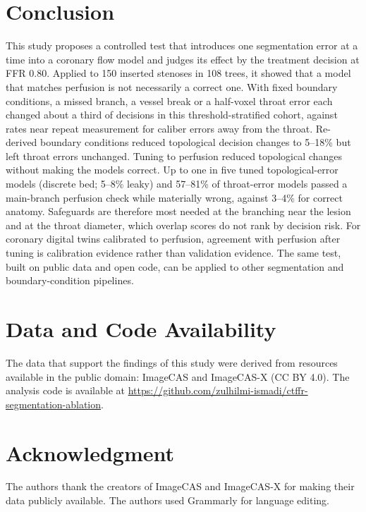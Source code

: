 \documentclass[journal,twoside,web]{ieeecolor}
\begin{document}
\section{Conclusion}
This study proposes a controlled test that introduces one segmentation error at a time into a coronary flow model and judges
its effect by the treatment decision at FFR 0.80. Applied to 150 inserted stenoses in 108 trees, it showed that a model that matches
perfusion is not necessarily a correct one. With fixed boundary conditions, a missed branch, a vessel break or a half-voxel throat error each changed about a
third of decisions in this threshold-stratified cohort, against rates near repeat measurement for caliber errors
away from the throat. Re-derived boundary conditions reduced topological decision changes to 5--18\% but left
throat errors unchanged. Tuning to perfusion reduced topological changes without making the models correct. Up to one in five tuned topological-error models (discrete bed; 5--8\% leaky) and 57--81\% of throat-error models passed a main-branch perfusion check while materially wrong, against 3--4\% for correct anatomy. Safeguards are therefore most
needed at the branching near the lesion and at the throat diameter, which overlap scores do not rank by decision risk.
For coronary digital twins calibrated to perfusion, agreement with perfusion after tuning is calibration evidence
rather than validation evidence. The same test, built on public data and open code, can be applied to other segmentation and
boundary-condition pipelines.

\section*{Data and Code Availability}
The data that support the findings of this study were derived from resources available in the public domain: ImageCAS \cite{zeng2023} and ImageCAS-X \cite{imagecasx_data} (CC BY 4.0). The analysis code is available at \url{https://github.com/zulhilmi-ismadi/ctffr-segmentation-ablation}.

\section*{Acknowledgment}
The authors thank the creators of ImageCAS and ImageCAS-X for making their data publicly available. The authors
used Grammarly for language editing.



\end{document}
